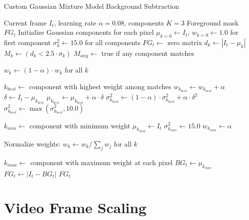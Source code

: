 \begin{algorithm}[!ht]
\caption{Custom Gaussian Mixture Model Background Subtraction}
\label{alg:cgmm}
\begin{algorithmic}[1]
\REQUIRE Current frame $I_t$, learning rate $\alpha=0.08$, components $K=3$
\ENSURE Foreground mask $FG_t$
    \STATE Initialize Gaussian components for each pixel
    \STATE $\mu_{k=0} \leftarrow I_t$, $w_{k=0} \leftarrow 1.0$ for first component
    \STATE $\sigma^2_k \leftarrow 15.0$ for all components
    \STATE $FG_t \leftarrow$ zero matrix
\ELSE
    \STATE $d_k \leftarrow |I_t - \mu_k|$ 
    \STATE $M_k \leftarrow (d_k < 2.5 \cdot \sigma_k)$ 
    \STATE $M_{any} \leftarrow$ true if any component matches
    
    \STATE $w_k \leftarrow (1-\alpha) \cdot w_k$ for all $k$ 
    
        \STATE $k_{best} \leftarrow$ component with highest weight among matches
        \STATE $w_{k_{best}} \leftarrow w_{k_{best}} + \alpha$
        \STATE $\delta \leftarrow I_t - \mu_{k_{best}}$ 
        \STATE $\mu_{k_{best}} \leftarrow \mu_{k_{best}} + \alpha \cdot \delta$
        \STATE $\sigma^2_{k_{best}} \leftarrow (1-\alpha) \cdot \sigma^2_{k_{best}} + \alpha \cdot \delta^2$
        \STATE $\sigma^2_{k_{best}} \leftarrow \max(\sigma^2_{k_{best}}, 10.0)$ 
    \ENDFOR
    
        \STATE $k_{min} \leftarrow$ component with minimum weight
        \STATE $\mu_{k_{min}} \leftarrow I_t$
        \STATE $\sigma^2_{k_{min}} \leftarrow 15.0$ 
        \STATE $w_{k_{min}} \leftarrow \alpha$
    \ENDFOR
    
    \STATE Normalize weights: $w_k \leftarrow w_k/\sum_j w_j$ for all $k$
    
    \STATE $k_{max} \leftarrow$ component with maximum weight at each pixel
    \STATE $BG_t \leftarrow \mu_{k_{max}}$ 
    \STATE $FG_t \leftarrow |I_t - BG_t|$ 
\ENDIF
\RETURN $FG_t$
\end{algorithmic}
\end{algorithm}

\section{Video Frame Scaling}

